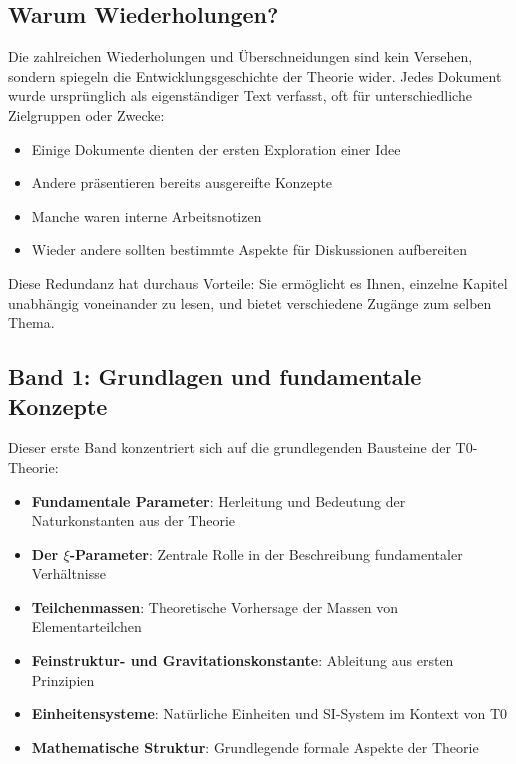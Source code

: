 \subsection*{Warum Wiederholungen?}

Die zahlreichen Wiederholungen und Überschneidungen sind kein Versehen, sondern spiegeln die Entwicklungsgeschichte der Theorie wider. Jedes Dokument wurde ursprünglich als eigenständiger Text verfasst, oft für unterschiedliche Zielgruppen oder Zwecke:

\begin{itemize}
\item Einige Dokumente dienten der ersten Exploration einer Idee
\item Andere präsentieren bereits ausgereifte Konzepte
\item Manche waren interne Arbeitsnotizen
\item Wieder andere sollten bestimmte Aspekte für Diskussionen aufbereiten
\end{itemize}

Diese Redundanz hat durchaus Vorteile: Sie ermöglicht es Ihnen, einzelne Kapitel unabhängig voneinander zu lesen, und bietet verschiedene Zugänge zum selben Thema.

\subsection*{Band 1: Grundlagen und fundamentale Konzepte}

Dieser erste Band konzentriert sich auf die grundlegenden Bausteine der T0-Theorie:

\begin{itemize}
\item \textbf{Fundamentale Parameter}: Herleitung und Bedeutung der Naturkonstanten aus der Theorie
\item \textbf{Der $\xi$-Parameter}: Zentrale Rolle in der Beschreibung fundamentaler Verhältnisse
\item \textbf{Teilchenmassen}: Theoretische Vorhersage der Massen von Elementarteilchen
\item \textbf{Feinstruktur- und Gravitationskonstante}: Ableitung aus ersten Prinzipien
\item \textbf{Einheitensysteme}: Natürliche Einheiten und SI-System im Kontext von T0
\item \textbf{Mathematische Struktur}: Grundlegende formale Aspekte der Theorie
\end{itemize}

